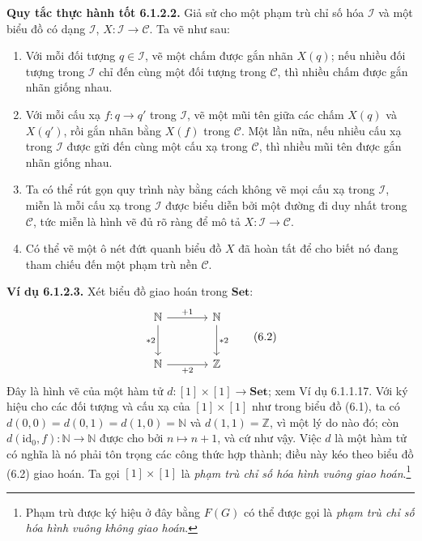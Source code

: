 \noindent\textbf{Quy tắc thực hành tốt 6.1.2.2.} Giả sử cho một phạm trù chỉ số hóa $\mathcal I$ và một biểu đồ có dạng $\mathcal I$, $X:\mathcal I\to\mathcal C$. Ta vẽ như sau:
\begin{enumerate}[label=(\roman*)]
\item Với mỗi đối tượng $q\in\mathcal I$, vẽ một chấm được gắn nhãn $X(q)$; nếu nhiều đối tượng trong $\mathcal I$ chỉ đến cùng một đối tượng trong $\mathcal C$, thì nhiều chấm được gắn nhãn giống nhau.
\item Với mỗi cấu xạ $f:q\to q'$ trong $\mathcal I$, vẽ một mũi tên giữa các chấm $X(q)$ và $X(q')$, rồi gắn nhãn bằng $X(f)$ trong $\mathcal C$. Một lần nữa, nếu nhiều cấu xạ trong $\mathcal I$ được gửi đến cùng một cấu xạ trong $\mathcal C$, thì nhiều mũi tên được gắn nhãn giống nhau.
\item Ta có thể rút gọn quy trình này bằng cách không vẽ mọi cấu xạ trong $\mathcal I$, miễn là mỗi cấu xạ trong $\mathcal I$ được biểu diễn bởi một đường đi duy nhất trong $\mathcal C$, tức miễn là hình vẽ đủ rõ ràng để mô tả $X:\mathcal I\to\mathcal C$.
\item Có thể vẽ một ô nét đứt quanh biểu đồ $X$ đã hoàn tất để cho biết nó đang tham chiếu đến một phạm trù nền $\mathcal C$.
\end{enumerate}

\noindent\textbf{Ví dụ 6.1.2.3.} Xét biểu đồ giao hoán trong $\mathbf{Set}$:
\begin{equation*}\begin{tikzcd}[column sep=large,row sep=large]\mathbb N\arrow[r,"+1"]\arrow[d,"\ast2"']&\mathbb N\arrow[d,"\ast2"]\\\mathbb N\arrow[r,"+2"']&\mathbb Z\end{tikzcd}\tag{6.2}\end{equation*}
Đây là hình vẽ của một hàm tử $d:[1]\times[1]\to\mathbf{Set}$; xem Ví dụ 6.1.1.17. Với ký hiệu cho các đối tượng và cấu xạ của $[1]\times[1]$ như trong biểu đồ (6.1), ta có $d(0,0)=d(0,1)=d(1,0)=\mathbb N$ và $d(1,1)=\mathbb Z$, vì một lý do nào đó; còn $d(\mathrm{id}_0,f):\mathbb N\to\mathbb N$ được cho bởi $n\mapsto n+1$, và cứ như vậy. Việc $d$ là một hàm tử có nghĩa là nó phải tôn trọng các công thức hợp thành; điều này kéo theo biểu đồ (6.2) giao hoán. Ta gọi $[1]\times[1]$ là \emph{phạm trù chỉ số hóa hình vuông giao hoán}.\footnote{Phạm trù được ký hiệu ở đây bằng $F(G)$ có thể được gọi là \emph{phạm trù chỉ số hóa hình vuông không giao hoán}.}

